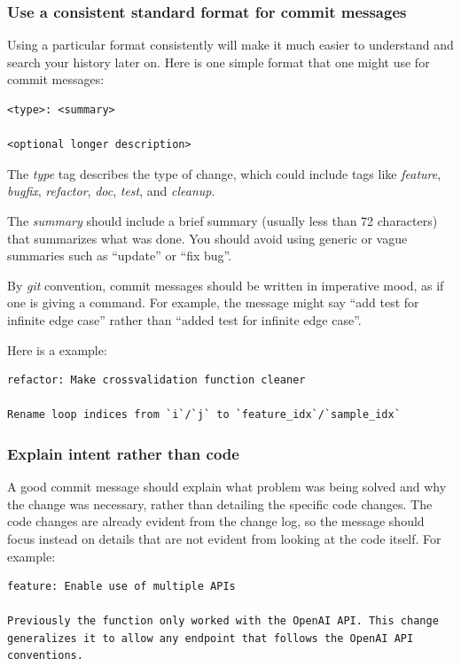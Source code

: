 \subsubsection{Use a consistent standard format for commit messages}

Using a particular format consistently will make it much easier to understand and search your history later on.
Here is one simple format that one might use for commit messages:

\begin{lstlisting}[style=transcriptshort]
<type>: <summary>

<optional longer description>
\end{lstlisting}

The \textit{type} tag describes the type of change, which could include tags like \textit{feature}, \textit{bugfix}, \textit{refactor}, \textit{doc}, \textit{test}, and \textit{cleanup}.

The \textit{summary} should include a brief summary (usually less than 72 characters) that summarizes what was done.
You should avoid using generic or vague summaries such as ``update'' or ``fix bug''.

By \textit{git} convention, commit messages should be written in imperative mood, as if one is giving a command.
For example, the message might say ``add test for infinite edge case'' rather than ``added test for infinite edge case''.

Here is a example:

\begin{lstlisting}[style=transcriptshort]
refactor: Make crossvalidation function cleaner

Rename loop indices from `i`/`j` to `feature_idx`/`sample_idx`
\end{lstlisting}

\subsubsection{Explain intent rather than code}

A good commit message should explain what problem was being solved and why the change was necessary, rather than detailing the specific code changes.
The code changes are already evident from the change log, so the message should focus instead on details that are not evident from looking at the code itself.
For example:

\begin{lstlisting}[style=transcriptshort]
feature: Enable use of multiple APIs

Previously the function only worked with the OpenAI API. This change generalizes it to allow any endpoint that follows the OpenAI API conventions.
\end{lstlisting}

